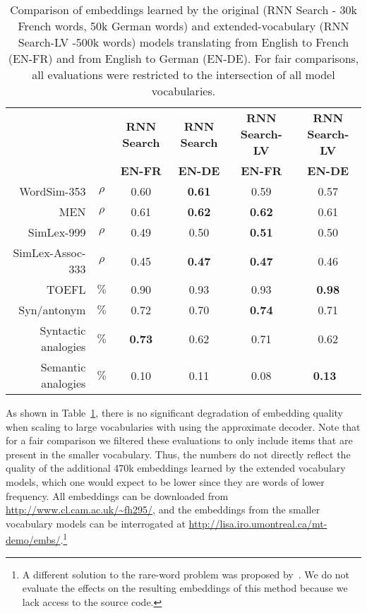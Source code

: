 \documentclass{article} %
\begin{document}
\begin{table}[t]
\begin{center}
\begin{tabular}{r c | c c c c }
    \multicolumn{2}{c|}{~} &\bf RNN Search &\bf RNN Search & \bf RNN Search-LV  & \bf RNN Search-LV  \\ 
 \multicolumn{2}{c|}{~} &\bf \small EN-FR &\bf \small  EN-DE & \bf  \small EN-FR & \bf \small EN-DE \\ 
\hline
WordSim-353   & \(\rho\) & 0.60 & \bf 0.61 & 0.59 & 0.57  \\
MEN & \(\rho\) & 0.61 & \bf 0.62 & \bf 0.62 & 0.61 \\
SimLex-999 & \(\rho\) & 0.49 & 0.50 & \bf  0.51 & 0.50  \\
SimLex-Assoc-333 & \(\rho\) & 0.45  & \bf 0.47  & \bf 0.47  & 0.46   \\
TOEFL & \(\%\) & 0.90 & 0.93 & 0.93 & \bf 0.98  \\
Syn/antonym & \(\%\) & 0.72 &  0.70 & \bf 0.74 & 0.71 \\
Syntactic analogies & \(\%\) & \bf 0.73 &  0.62 & 0.71 & 0.62\\
Semantic analogies & \(\%\) & 0.10 &  0.11 & 0.08 & \bf 0.13\
\end{tabular}
\caption{Comparison of embeddings learned by the original (RNN Search - 30k French words, 50k German words) and extended-vocabulary (RNN Search-LV -500k words) models translating from English to French (EN-FR) and from English to German (EN-DE). For fair comparisons, all evaluations were restricted to the intersection of all model vocabularies.}
\label{table:ex}
\end{center}
\vspace{-5mm}
\end{table}

As shown in Table~\ref{table:ex}, there is no significant degradation of embedding quality when scaling to large vocabularies with using the approximate decoder. Note that for a fair comparison we filtered these evaluations to only include items that are present in the smaller vocabulary. Thus, the numbers do not directly reflect the quality of the additional 470k embeddings learned by the extended vocabulary models, which one would expect to be lower since they are words of lower frequency. All embeddings can be downloaded from \url{http://www.cl.cam.ac.uk/~fh295/}, and the embeddings from the smaller vocabulary models can be interrogated at \url{http://lisa.iro.umontreal.ca/mt-demo/embs/}.\footnote{A different solution to the rare-word problem was proposed by~\citep{luong2014addressing}. We do not evaluate the effects on the resulting embeddings of this method because we lack access to the source code.} 
\end{document}
